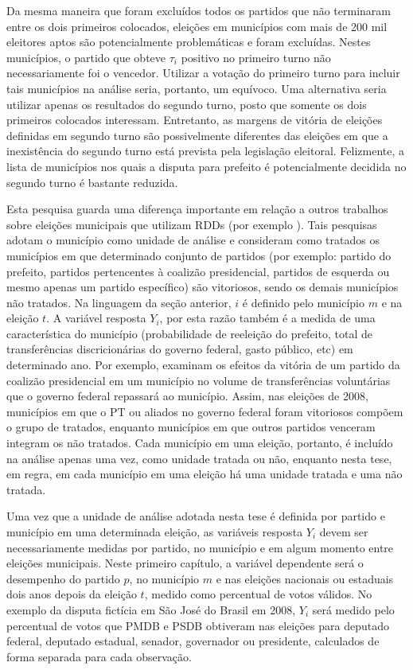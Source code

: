 Da mesma maneira que foram excluídos todos os partidos que não terminaram entre os dois primeiros colocados, eleições em municípios com mais de 200 mil eleitores aptos são potencialmente problemáticas e foram excluídas. Nestes municípios, o partido que obteve $\tau_{i}$ positivo no primeiro turno não necessariamente foi o vencedor. Utilizar a votação do primeiro turno para incluir tais municípios na análise seria, portanto, um equívoco. Uma alternativa seria utilizar apenas os resultados do segundo turno, posto que somente os dois primeiros colocados interessam. Entretanto, as margens de vitória de eleições definidas em segundo turno são possivelmente diferentes das eleições em que a inexistência do segundo turno está prevista pela legislação eleitoral. Felizmente, a lista de municípios nos quais a disputa para prefeito é potencialmente decidida no segundo turno é bastante reduzida.

Esta pesquisa guarda uma diferença importante em relação a outros trabalhos sobre eleições municipais que utilizam RDDs (por exemplo \citealp*{Brollo2012, Brambor2012, Titiunik2011, Bueno2014}). Tais pesquisas adotam o município como unidade de análise e consideram como tratados os municípios em que determinado conjunto de partidos (por exemplo: partido do prefeito, partidos pertencentes à coalizão presidencial, partidos de esquerda ou mesmo apenas um partido específico) são vitoriosos, sendo os demais municípios não tratados. Na linguagem da seção anterior, $i$ é definido pelo município $m$ e na eleição $t$. A variável resposta $Y_{i}$, por esta razão também é a medida de uma característica do município (probabilidade de reeleição do prefeito, total de transferências discricionárias do governo federal, gasto público, etc) em determinado ano. Por exemplo, \citet{Brollo2012} examinam os efeitos da vitória de um partido da coalizão presidencial em um município no volume de transferências voluntárias que o governo federal repassará ao município. Assim, nas eleições de 2008, municípios em que o PT ou aliados no governo federal foram vitoriosos compõem o grupo de tratados, enquanto municípios em que outros partidos venceram integram os não tratados. Cada município em uma eleição, portanto, é incluído na análise apenas uma vez, como unidade tratada ou não, enquanto nesta tese, em regra, em cada município em uma eleição há uma unidade tratada e uma não tratada.

Uma vez que a unidade de análise adotada nesta tese é definida por partido e município em uma determinada eleição, as variáveis resposta $Y_{i}$ devem ser necessariamente medidas por partido, no município e em algum momento entre eleições municipais. Neste primeiro capítulo, a variável dependente será o desempenho do partido $p$, no município $m$ e nas eleições nacionais ou estaduais dois anos depois da eleição $t$, medido como percentual de votos válidos. No exemplo da disputa fictícia em São José do Brasil em 2008, $Y_{i}$ será medido pelo percentual de votos que PMDB e PSDB obtiveram nas eleições para deputado federal, deputado estadual, senador, governador ou presidente, calculados de forma separada para cada observação.

